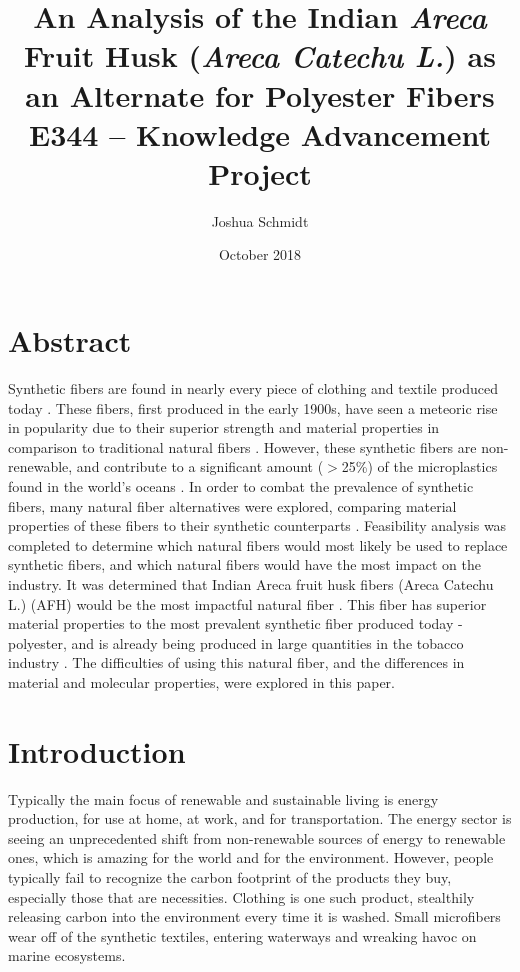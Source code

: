 \documentclass{article}
\title{%
	An Analysis of the Indian \textit{Areca} Fruit Husk (\textit{Areca Catechu L.}) as an Alternate for Polyester Fibers \\
	\large E344 – Knowledge Advancement Project}
\date{October 2018}
\author{Joshua Schmidt }
\begin{document}
\maketitle
\section{Abstract}

Synthetic fibers are found in nearly every piece of clothing and textile produced today \autocite{ihsmarkit}. These fibers, first produced in the early 1900s, have seen a meteoric rise in popularity due to their superior strength and material properties in comparison to traditional natural fibers \autocite{craftechindustries}. However, these synthetic fibers are non-renewable, and contribute to a significant amount ($>$25\%) of the microplastics found in the world's oceans \autocite{quantifyingfibers}\autocite{noaamicroplastics}. In order to combat the prevalence of synthetic fibers, many natural fiber alternatives were explored, comparing material properties of these fibers to their synthetic counterparts \autocite{naturalfiberreview}. Feasibility analysis was completed to determine which natural fibers would most likely be used to replace synthetic fibers, and which natural fibers would have the most impact on the industry. It was determined that Indian Areca fruit husk fibers (Areca Catechu L.) (AFH) would be the most impactful natural fiber \autocite{afhfiber}. This fiber has superior material properties to the most prevalent synthetic fiber produced today - polyester, and is already being produced in large quantities in the tobacco industry \autocite{afhfiber}. The difficulties of using this natural fiber, and the differences in material and molecular properties, were explored in this paper.

\section{Introduction}

Typically the main focus of renewable and sustainable living is energy production, for use at home, at work, and for transportation. The energy sector is seeing an unprecedented shift from non-renewable sources of energy to renewable ones, which is amazing for the world and for the environment. However, people typically fail to recognize the carbon footprint of the products they buy, especially those that are necessities. Clothing is one such product, stealthily releasing carbon into the environment every time it is washed. Small microfibers wear off of the synthetic textiles, entering waterways and wreaking havoc on marine ecosystems.
\end{document}
